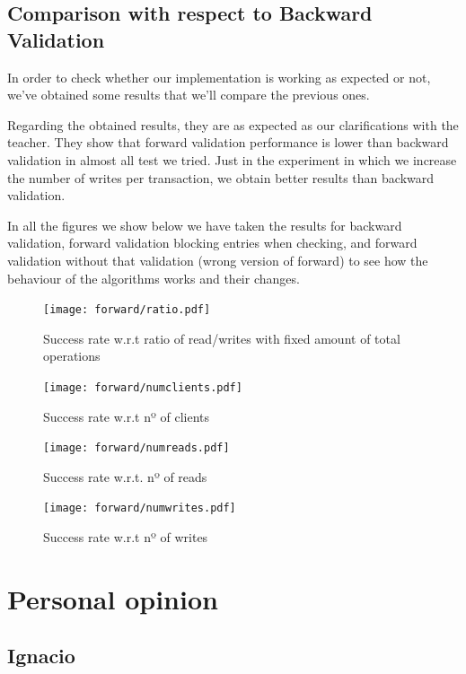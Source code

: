\documentclass[a4paper, 10pt]{article}
\begin{document}
\clearpage

\subsection{Comparison with respect to Backward Validation}
In order to check whether our implementation is working as expected or not, we've obtained some results that we'll compare the previous ones. 

Regarding the obtained results, they are as expected as our clarifications with the teacher. They show that forward validation performance is lower than backward validation in almost all test we tried. Just in the experiment in which we increase the number of writes per transaction, we obtain better results than backward validation.

In all the figures we show below we have taken the results for backward validation, forward validation blocking entries when checking, and forward validation without that validation (wrong version of forward) to see how the behaviour of the algorithms works and their changes.


\begin{figure}[H]
  \centering
  \texttt{[image: forward/ratio.pdf]}
    \caption{Success rate w.r.t ratio of read/writes with fixed amount of total operations}
    \label{}
\end{figure} 

\begin{figure}[H]
  \centering
  \texttt{[image: forward/numclients.pdf]}
    \caption{Success rate w.r.t nº of clients}
    \label{}
\end{figure} 

\begin{figure}[H]
  \centering
  \texttt{[image: forward/numreads.pdf]}
    \caption{Success rate w.r.t. nº of reads}
    \label{}
\end{figure} 

\begin{figure}[H]
  \centering
  \texttt{[image: forward/numwrites.pdf]}
    \caption{Success rate w.r.t nº of writes}
    \label{}
\end{figure} 



\clearpage
\section{Personal opinion}

\subsection{Ignacio}
\end{document}
